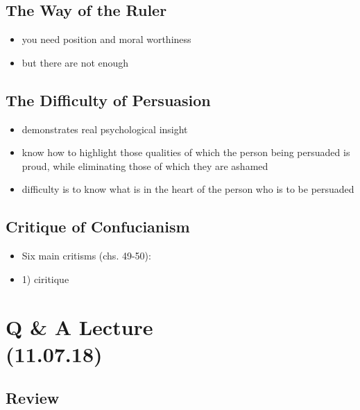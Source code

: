 \documentclass[emulatestandardclasses]{scrartcl}
\begin{document}
\subsection{The Way of the Ruler}

\begin{itemize}
  \item you need position and moral worthiness
  \item but there are not enough 
\end{itemize}
\subsection{The Difficulty of Persuasion}

\begin{itemize}
  \item demonstrates real psychological insight
  \item know how to highlight those qualities of which the person being persuaded is proud, while eliminating those of which they are ashamed
  \item difficulty is to know what is in the heart of the person who is to be persuaded
\end{itemize}

\subsection{Critique of Confucianism}

\begin{itemize}
  \item Six main critisms (chs. 49-50):
  \item 1) ciritique 
\end{itemize}


\section{Q \& A Lecture\\(11.07.18)}

\subsection{Review}
\end{document}
